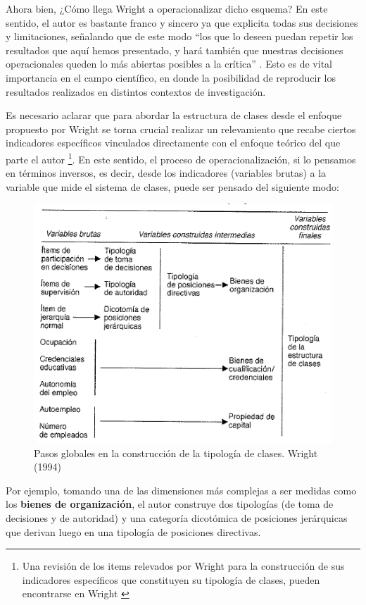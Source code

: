 \documentclass[
]{book}
\begin{document}
Ahora bien, ¿Cómo llega Wright a operacionalizar dicho esquema? En este sentido, el autor es bastante franco y sincero ya que explicita todas sus decisiones y limitaciones, señalando que de este modo ``los que lo deseen puedan repetir los resultados que aquí hemos presentado, y hará también que nuestras decisiones operacionales queden lo más abiertas posibles a la crítica'' \citep{Wright1994b}. Esto es de vital importancia en el campo científico, en donde la posibilidad de reproducir los resultados realizados en distintos contextos de investigación.

Es necesario aclarar que para abordar la estructura de clases desde el enfoque propuesto por Wright se torna crucial realizar un relevamiento que recabe ciertos indicadores específicos vinculados directamente con el enfoque teórico del que parte el autor \footnote{Una revisión de los items relevados por Wright para la construcción de sus indicadores específicos que constituyen su tipología de clases, pueden encontrarse en Wright \citeyearpar[pp.~331-345]{Wright1994b}}. En este sentido, el proceso de operacionalización, si lo pensamos en términos inversos, es decir, desde los indicadores (variables brutas) a la variable que mide el sistema de clases, puede ser pensado del siguiente modo:

\begin{figure}

{\centering \includegraphics[width=0.8\linewidth]{imagenes/wright2} 

}

\caption{Pasos globales en la construcción de la tipología de clases. Wright (1994)}\label{fig:unnamed-chunk-60}
\end{figure}

Por ejemplo, tomando una de las dimensiones más complejas a ser medidas como los \textbf{bienes de organización}, el autor construye dos tipologías (de toma de decisiones y de autoridad) y una categoría dicotómica de posiciones jerárquicas que derivan luego en una tipología de posiciones directivas.
\end{document}
